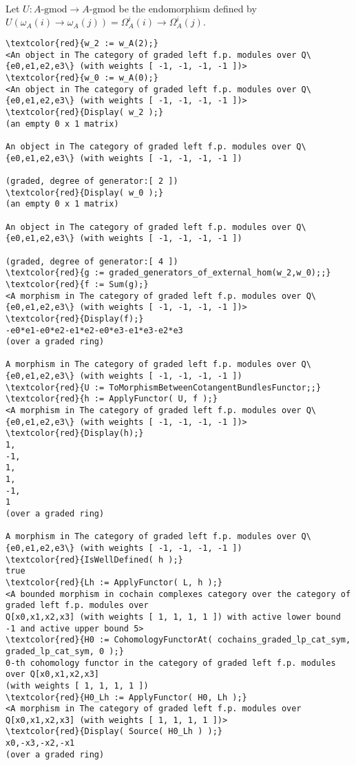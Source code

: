 \documentclass[16pt,a4paper]{extarticle}
\theoremstyle{definition}
\begin{document}
Let $U:A\mbox{-gmod} \rightarrow A\mbox{-gmod}$ be the endomorphism defined by
$U(\omega_A(i)\rightarrow \omega_A(j))=\Omega_A^i(i)\rightarrow \Omega_A^i(j).$
\begin{Verbatim}[commandchars=\\\{\}]
\textcolor{red}{w_2 := w_A(2);}
<An object in The category of graded left f.p. modules over Q\{e0,e1,e2,e3\} (with weights [ -1, -1, -1, -1 ])>
\textcolor{red}{w_0 := w_A(0);}
<An object in The category of graded left f.p. modules over Q\{e0,e1,e2,e3\} (with weights [ -1, -1, -1, -1 ])>
\textcolor{red}{Display( w_2 );}
(an empty 0 x 1 matrix)

An object in The category of graded left f.p. modules over Q\{e0,e1,e2,e3\} (with weights [ -1, -1, -1, -1 ])

(graded, degree of generator:[ 2 ])
\textcolor{red}{Display( w_0 );}
(an empty 0 x 1 matrix)

An object in The category of graded left f.p. modules over Q\{e0,e1,e2,e3\} (with weights [ -1, -1, -1, -1 ])

(graded, degree of generator:[ 4 ])
\textcolor{red}{g := graded_generators_of_external_hom(w_2,w_0);;}
\textcolor{red}{f := Sum(g);}
<A morphism in The category of graded left f.p. modules over Q\{e0,e1,e2,e3\} (with weights [ -1, -1, -1, -1 ])>
\textcolor{red}{Display(f);}
-e0*e1-e0*e2-e1*e2-e0*e3-e1*e3-e2*e3
(over a graded ring)
	
A morphism in The category of graded left f.p. modules over Q\{e0,e1,e2,e3\} (with weights [ -1, -1, -1, -1 ])
\textcolor{red}{U := ToMorphismBetweenCotangentBundlesFunctor;;}
\textcolor{red}{h := ApplyFunctor( U, f );}
<A morphism in The category of graded left f.p. modules over Q\{e0,e1,e2,e3\} (with weights [ -1, -1, -1, -1 ])>
\textcolor{red}{Display(h);}
1, 
-1,
1, 
1, 
-1,
1  
(over a graded ring)
	
A morphism in The category of graded left f.p. modules over Q\{e0,e1,e2,e3\} (with weights [ -1, -1, -1, -1 ])
\textcolor{red}{IsWellDefined( h );}
true
\textcolor{red}{Lh := ApplyFunctor( L, h );}
<A bounded morphism in cochain complexes category over the category of graded left f.p. modules over 
Q[x0,x1,x2,x3] (with weights [ 1, 1, 1, 1 ]) with active lower bound -1 and active upper bound 5>
\textcolor{red}{H0 := CohomologyFunctorAt( cochains_graded_lp_cat_sym, graded_lp_cat_sym, 0 );}
0-th cohomology functor in the category of graded left f.p. modules over Q[x0,x1,x2,x3] 
(with weights [ 1, 1, 1, 1 ])
\textcolor{red}{H0_Lh := ApplyFunctor( H0, Lh );}
<A morphism in The category of graded left f.p. modules over Q[x0,x1,x2,x3] (with weights [ 1, 1, 1, 1 ])>
\textcolor{red}{Display( Source( H0_Lh ) );}
x0,-x3,-x2,-x1
(over a graded ring)
	

\end{Verbatim}
\end{document}
